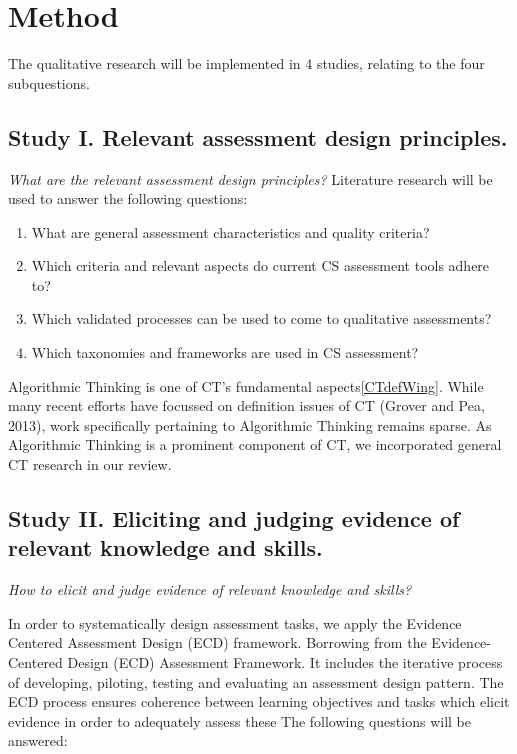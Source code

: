 \section{Method}\label{sec:method}




The qualitative research will be implemented in 4 studies, relating to the four subquestions.

\subsection{Study I. Relevant assessment design principles.}
\textit{What are the relevant assessment design principles?}\newline
Literature research will be used to answer the following questions:

\begin{enumerate}
\item What are general assessment characteristics and quality criteria?
\item Which criteria and relevant aspects do current CS assessment tools adhere to?
\item Which validated processes can be used to come to qualitative assessments?
\item Which taxonomies and frameworks are used in CS assessment?
\end{enumerate}

Algorithmic Thinking is one of CT's fundamental aspects\ref{CTdefWing}. While many recent efforts have focussed on definition issues of CT (Grover and Pea, 2013), work specifically pertaining to Algorithmic Thinking remains sparse. As Algorithmic Thinking is a prominent component of CT, we incorporated general CT research in our review.



\subsection{Study II. Eliciting and judging evidence of relevant knowledge and skills.}
\textit{How to elicit and judge evidence of relevant knowledge and skills?}\newline

In order to systematically design assessment tasks, we apply the Evidence Centered Assessment Design (ECD) framework.
 Borrowing from the Evidence-Centered Design (ECD) Assessment Framework. It includes the iterative process of developing, piloting, testing and evaluating an assessment design pattern. The ECD process ensures coherence between learning objectives and tasks which elicit evidence in order to adequately assess these
 The following questions will be answered:


